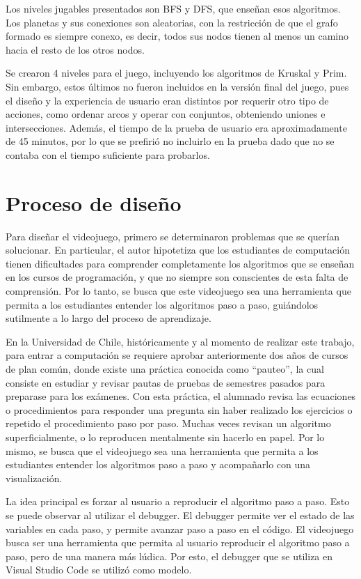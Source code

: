 Los niveles jugables presentados son BFS y DFS, que enseñan esos algoritmos. Los planetas y sus conexiones son aleatorias, con la restricción de que el grafo formado es siempre conexo, es decir, todos sus nodos tienen al menos un camino hacia el resto de los otros nodos.

Se crearon 4 niveles para el juego, incluyendo los algoritmos de Kruskal y Prim. Sin embargo, estos últimos no fueron incluidos en la versión final del juego, pues el diseño y la experiencia de usuario eran distintos por requerir otro tipo de acciones, como ordenar arcos y operar con conjuntos, obteniendo uniones e intersecciones. Además, el tiempo de la prueba de usuario era aproximadamente de 45 minutos, por lo que se prefirió no incluirlo en la prueba dado que no se contaba con el tiempo suficiente para probarlos.


\section{Proceso de diseño}

Para diseñar el videojuego, primero se determinaron problemas que se querían solucionar. En particular, el autor hipotetiza que los estudiantes de computación tienen dificultades para comprender completamente los algoritmos que se enseñan en los cursos de programación, y que no siempre son conscientes de esta falta de comprensión. Por lo tanto, se busca que este videojuego sea una herramienta que permita a los estudiantes entender los algoritmos paso a paso, guiándolos sutilmente a lo largo del proceso de aprendizaje.

En la Universidad de Chile, históricamente y al momento de realizar este trabajo, para entrar a computación se requiere aprobar anteriormente dos años de cursos de plan común, donde existe una práctica conocida como ``pauteo'', la cual consiste en estudiar y revisar pautas de pruebas de semestres pasados para preparase para los exámenes. Con esta práctica, el alumnado revisa las ecuaciones o procedimientos para responder una pregunta sin haber realizado los ejercicios o repetido el procedimiento paso por paso. Muchas veces revisan un algoritmo superficialmente, o lo reproducen mentalmente sin hacerlo en papel. Por lo mismo, se busca que el videojuego sea una herramienta que permita a los estudiantes entender los algoritmos paso a paso y acompañarlo con una visualización.

La idea principal es forzar al usuario a reproducir el algoritmo paso a paso. Esto se puede observar al utilizar el debugger. El debugger permite ver el estado de las variables en cada paso, y permite avanzar paso a paso en el código. El videojuego busca ser una herramienta que permita al usuario reproducir el algoritmo paso a paso, pero de una manera más lúdica. Por esto, el debugger que se utiliza en Visual Studio Code se utilizó como modelo.

